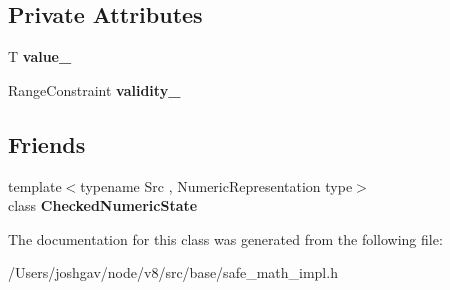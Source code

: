 \subsection*{Private Attributes}
\begin{DoxyCompactItemize}
\item 
T {\bfseries value\+\_\+}\hypertarget{classv8_1_1base_1_1internal_1_1_checked_numeric_state_3_01_t_00_01_n_u_m_e_r_i_c___i_n_t_e_g_e_r_01_4_a09b63dd67a1579bd21e84a054e7da490}{}\label{classv8_1_1base_1_1internal_1_1_checked_numeric_state_3_01_t_00_01_n_u_m_e_r_i_c___i_n_t_e_g_e_r_01_4_a09b63dd67a1579bd21e84a054e7da490}

\item 
Range\+Constraint {\bfseries validity\+\_\+}\hypertarget{classv8_1_1base_1_1internal_1_1_checked_numeric_state_3_01_t_00_01_n_u_m_e_r_i_c___i_n_t_e_g_e_r_01_4_a8edc391ad154e8c6bf0b32e854bcc63d}{}\label{classv8_1_1base_1_1internal_1_1_checked_numeric_state_3_01_t_00_01_n_u_m_e_r_i_c___i_n_t_e_g_e_r_01_4_a8edc391ad154e8c6bf0b32e854bcc63d}

\end{DoxyCompactItemize}
\subsection*{Friends}
\begin{DoxyCompactItemize}
\item 
{\footnotesize template$<$typename Src , Numeric\+Representation type$>$ }\\class {\bfseries Checked\+Numeric\+State}\hypertarget{classv8_1_1base_1_1internal_1_1_checked_numeric_state_3_01_t_00_01_n_u_m_e_r_i_c___i_n_t_e_g_e_r_01_4_aa1362ebca148abcec1d121fc04fb976b}{}\label{classv8_1_1base_1_1internal_1_1_checked_numeric_state_3_01_t_00_01_n_u_m_e_r_i_c___i_n_t_e_g_e_r_01_4_aa1362ebca148abcec1d121fc04fb976b}

\end{DoxyCompactItemize}


The documentation for this class was generated from the following file\+:\begin{DoxyCompactItemize}
\item 
/\+Users/joshgav/node/v8/src/base/safe\+\_\+math\+\_\+impl.\+h\end{DoxyCompactItemize}
